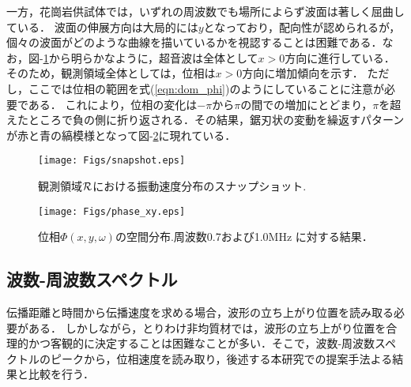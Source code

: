 一方，花崗岩供試体では，いずれの周波数でも場所によらず波面は著しく屈曲している．
波面の伸展方向は大局的には$y$となっており，配向性が認められるが，個々の波面がどのような曲線を描いているかを視認することは困難である．なお，図-\ref{fig:fig4}から明らかなように，超音波は全体として$x>0$方向に進行している．そのため，観測領域全体としては，位相は$x>0$方向に増加傾向を示す．
ただし，ここでは位相の範囲を式(\ref{eqn:dom_phi})のようにしていることに注意が必要である．
これにより，位相の変化は$-\pi$から$\pi$の間での増加にとどまり，$\pi$を超えたところで負の側に折り返される．その結果，鋸刃状の変動を繰返すパターンが赤と青の縞模様となって図-\ref{fig:fig5}に現れている．
\begin{figure}
\begin{center}
	\texttt{[image: Figs/snapshot.eps]}
\caption{
	観測領域${\cal R}$における振動速度分布のスナップショット.
}
\label{fig:fig4}
\end{center}
\end{figure}
\begin{figure}
\begin{center}
	\texttt{[image: Figs/phase\_xy.eps]}
	\caption{位相$\Phi(x,y,\omega)$の空間分布.周波数0.7および1.0MHz
	に対する結果．}
	\label{fig:fig5}
\end{center}
\end{figure}
\subsection{波数-周波数スペクトル}
伝播距離と時間から伝播速度を求める場合，波形の立ち上がり位置を読み取る必要がある．
しかしながら，とりわけ非均質材では，波形の立ち上がり位置を合理的かつ客観的に決定することは困難なことが多い．そこで，波数-周波数スペクトルのピークから，位相速度を読み取り，後述する本研究での提案手法よる結果と比較を行う．

